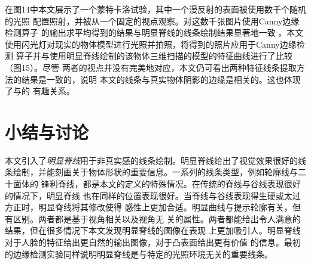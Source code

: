 \documentclass[10pt,a4paper]{article}
\theoremstyle{mythm}%
\numberwithin{equation}{section}
\begin{document}
\begin{CJK*}{UTF8}{wqyzh}
在图14中本文展示了一个蒙特卡洛试验，其中一个漫反射的表面被使用数千个随机的光照
配置照射，并被从一个固定的视点观察。对这数千张图片使用Canny边缘检测算子
\cite{Canny:1986:CAED}的输出求平均得到的结果与明显脊线的线条绘制结果显著地一致
。本文使用闪光灯对现实的物体模型进行光照并拍照，将得到的照片应用于Canny边缘检测
算子并与使用明显脊线绘制的该物体三维扫描的模型的特征曲线进行了比较（图15）。尽管
两者的视点并没有完美地对应，本文仍可看出两种特征线条提取方法的结果是一致的，说明
本文的线条与真实物体阴影的边缘是相关的。这也体现了与\cite{Raskar:2007:NPRC}的
有趣关系。


\section{小结与讨论}

本文引入了\emph{明显脊线}用于非真实感的线条绘制。明显脊线给出了视觉效果很好的线
条绘制，并能刻画关于物体形状的重要信息。一系列的线条类型，例如轮廓线与二十面体的
锋利脊线，都是本文的定义的特殊情况。在传统的脊线与谷线表现很好的情况下，明显脊线
也在同样的位置表现很好。当脊线与谷线表现得生硬或太过方正时，明显脊线将其修改使得
感性上更加合适。明显曲线与提示轮廓有关，但有区别。两者都是基于视角相关以及视角无
关的属性。两者都能给出令人满意的结果，但在很多情况下本文发现明显脊线的图像在表现
上更加吸引人。明显脊线对于人脸的特征给出更自然的输出图像，对于凸表面给出更有价值
的信息。最初的边缘检测实验同样说明明显脊线是与特定的光照环境无关的重要线条。





\end{CJK*}
\end{document}
